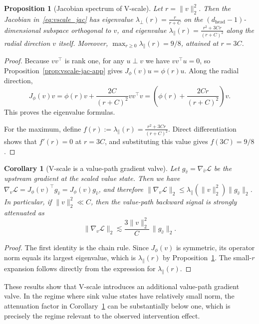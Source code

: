 \documentclass{article}
\theoremstyle{plain}
\newtheorem{proposition}{Proposition}
\newtheorem{corollary}{Corollary}
\theoremstyle{definition}
\theoremstyle{remark}
\begin{document}
\begin{proposition}[Jacobian spectrum of V-scale]\label{prop:vscale_main}
Let $r=\|v\|_2^2$.
Then the Jacobian in~\eqref{eq:vscale_jac} has eigenvalue $\lambda_\perp(r)=\frac{r}{r+C}$ on the $(d_{\mathrm{head}}-1)$-dimensional subspace orthogonal to $v$, and eigenvalue $\lambda_\parallel(r) = \frac{r^2+3Cr}{(r+C)^2}$ along the radial direction $v$ itself.
Moreover, $\max_{r\ge 0} \lambda_\parallel(r)={9}/{8}$, attained at $r=3C$.
\end{proposition}

\begin{proof}
Because $vv^\top$ is rank one, for any $u\perp v$ we have $vv^\top u = 0$, so Proposition~\ref{prop:vscale-jac-app} gives $J_\phi(v)u = \phi(r)u$. Along the radial direction,
\[
    J_\phi(v)v = \phi(r)v + \frac{2C}{(r+C)^2}vv^\top v = \left(\phi(r) + \frac{2Cr}{(r+C)^2}\right)v.
\]
This proves the eigenvalue formulas.

For the maximum, define $f(r) := \lambda_\parallel(r) = \frac{r^2+3Cr}{(r+C)^2}$.
Direct differentiation shows that $f'(r)=0$ at $r=3C$, and substituting this value gives $f(3C)=9/8$.
\end{proof}

\begin{corollary}[V-scale is a value-path gradient valve]\label{cor:vscale_main}
Let $g_{\hat v}=\nabla_{\hat v}\mathcal{L}$ be the upstream gradient at the scaled value state.
Then we have $\nabla_v \mathcal{L} = J_{\phi}(v)^\top g_{\hat v} = J_{\phi}(v) g_{\hat v}$,
and therefore $\|\nabla_v \mathcal{L}\|_2 \le \lambda_\parallel(\|v\|_2^2)\|g_{\hat v}\|_2$.
In particular, if $\|v\|_2^2\ll C$, then the value-path backward signal is strongly attenuated as
\[
\|\nabla_v \mathcal{L}\|_2
\lesssim
\frac{3\|v\|_2^2}{C}
\,\|g_{\hat v}\|_2.
\]
\end{corollary}

\begin{proof}
The first identity is the chain rule. Since $J_\phi(v)$ is symmetric, its operator norm equals its largest eigenvalue, which is $\lambda_\parallel(r)$ by Proposition~\ref{prop:vscale_main}. The small-$r$ expansion follows directly from the expression for $\lambda_\parallel(r)$.
\end{proof}

These results show that V-scale introduces an additional value-path gradient valve. In the regime where sink value states have relatively small norm, the attenuation factor in Corollary~\ref{cor:vscale_main} can be substantially below one, which is precisely the regime relevant to the observed intervention effect.
\end{document}
